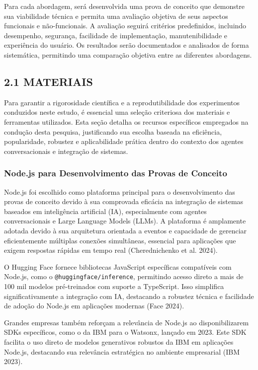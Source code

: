 \documentclass[
]{article}
\begin{document}
Para cada abordagem, será desenvolvida uma prova de conceito que
demonstre sua viabilidade técnica e permita uma avaliação objetiva de
seus aspectos funcionais e não-funcionais. A avaliação seguirá critérios
predefinidos, incluindo desempenho, segurança, facilidade de
implementação, manutenibilidade e experiência do usuário. Os resultados
serão documentados e analisados de forma sistemática, permitindo uma
comparação objetiva entre as diferentes abordagens.

\subsection{2.1 MATERIAIS}\label{materiais}

Para garantir a rigorosidade científica e a reprodutibilidade dos
experimentos conduzidos neste estudo, é essencial uma seleção criteriosa
dos materiais e ferramentas utilizados. Esta seção detalha os recursos
específicos empregados na condução desta pesquisa, justificando sua
escolha baseada na eficiência, popularidade, robustez e aplicabilidade
prática dentro do contexto dos agentes conversacionais e integração de
sistemas.

\subsubsection{Node.js para Desenvolvimento das Provas de
Conceito}\label{node.js-para-desenvolvimento-das-provas-de-conceito}

Node.js foi escolhido como plataforma principal para o desenvolvimento
das provas de conceito devido à sua comprovada eficácia na integração de
sistemas baseados em inteligência artificial (IA), especialmente com
agentes conversacionais e Large Language Models (LLMs). A plataforma é
amplamente adotada devido à sua arquitetura orientada a eventos e
capacidade de gerenciar eficientemente múltiplas conexões simultâneas,
essencial para aplicações que exigem respostas rápidas em tempo real
(Cherednichenko et al. 2024).

O Hugging Face fornece bibliotecas JavaScript específicas compatíveis
com Node.js, como o \texttt{@huggingface/inference}, permitindo acesso
direto a mais de 100 mil modelos pré-treinados com suporte a TypeScript.
Isso simplifica significativamente a integração com IA, destacando a
robustez técnica e facilidade de adoção do Node.js em aplicações
modernas (Face 2024).

Grandes empresas também reforçam a relevância de Node.js ao
disponibilizarem SDKs específicos, como o da IBM para o Watsonx, lançado
em 2023. Este SDK facilita o uso direto de modelos generativos robustos
da IBM em aplicações Node.js, destacando sua relevância estratégica no
ambiente empresarial (IBM 2023).
\end{document}
